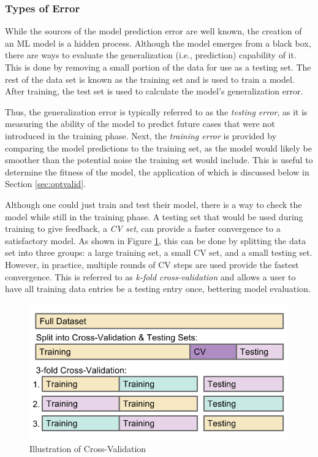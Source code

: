 \subsubsection{Types of Error}

While the sources of the model prediction error are well known, the creation of
an \gls{ML} model is a hidden process. Although the model emerges from a black
box, there are ways to evaluate the generalization (i.e., prediction)
capability of it.  This is done by removing a small portion of the data for use
as a testing set.  The rest of the data set is known as the training set and is
used to train a model. After training, the test set is used to calculate the
model's generalization error.  

Thus, the generalization error is typically referred to as the \textit{testing
error}, as it is measuring the ability of the model to predict future cases
that were not introduced in the training phase.  Next, the \textit{training
error} is provided by comparing the model predictions to the training set, as
the model would likely be smoother than the potential noise the training set
would include. This is useful to determine the fitness of the model, the
application of which is discussed below in Section \ref{sec:optvalid}.

Although one could just train and test their model, there is a way to check the
model while still in the training phase. A testing set that would be used
during training to give feedback, a \textit{\gls{CV} set}, can provide a faster
convergence to a satisfactory model. As shown in Figure \ref{fig:cverror}, this
can be done by splitting the data set into three groups: a large training set,
a small \gls{CV} set, and a small testing set.  However, in practice, multiple
rounds of \gls{CV} steps are used provide the fastest convergence.  This is
referred to as \textit{k-fold cross-validation} and allows a user to have all
training data entries be a testing entry once, bettering model evaluation. 

\begin{figure}[!htb]
  \centering
  \includegraphics[width=0.85\linewidth]{./chapters/litrev/cverror.png}
  \caption{Illustration of Cross-Validation}
  \label{fig:cverror}
\end{figure}

